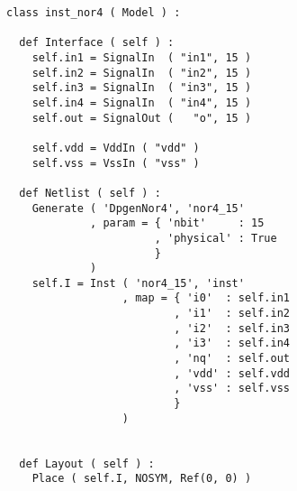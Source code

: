 \begin{itemize}
\begin{verbatim}
class inst_nor4 ( Model ) :

  def Interface ( self ) :
    self.in1 = SignalIn  ( "in1", 15 )
    self.in2 = SignalIn  ( "in2", 15 )
    self.in3 = SignalIn  ( "in3", 15 )
    self.in4 = SignalIn  ( "in4", 15 )
    self.out = SignalOut (   "o", 15 )

    self.vdd = VddIn ( "vdd" )
    self.vss = VssIn ( "vss" )
    
  def Netlist ( self ) :
    Generate ( 'DpgenNor4', 'nor4_15'
             , param = { 'nbit'     : 15
                       , 'physical' : True
                       }
             )
    self.I = Inst ( 'nor4_15', 'inst'
                  , map = { 'i0'  : self.in1
                          , 'i1'  : self.in2
                          , 'i2'  : self.in3
                          , 'i3'  : self.in4
                          , 'nq'  : self.out
                          , 'vdd' : self.vdd
                          , 'vss' : self.vss
                          }
                  )
      
    
  def Layout ( self ) :
    Place ( self.I, NOSYM, Ref(0, 0) )
\end{verbatim}
\end{itemize}
